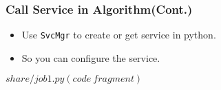 \begin{frame}
    \frametitle{Call Service in Algorithm(Cont.)}
    \begin{itemize}
        \item Use {\tt SvcMgr} to create or get service in python.
        \item So you can configure the service.
    \end{itemize}
    \begin{block}{\(share/job1.py(code\ fragment)\)}
        \par\usebox{\callsvcpy}
    \end{block}
\end{frame}
